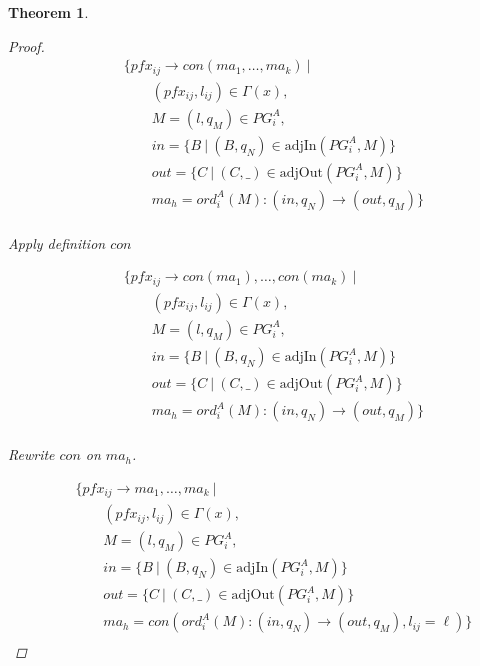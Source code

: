 \documentclass[twocolumn]{sig-alternate-10pt}
\newtheorem{thm}{Theorem}[section]
\begin{document}
\begin{thm}
\begin{proof}
  \[ \begin{array}{l}
     ~~~~~~~~~ \{ pfx_{ij} \rightarrow con(ma_1, \dots, ma_k) ~\vert~ \\
     ~~~~~~~~~~~~~~~~~~ (pfx_{ij}, l_{ij}) \in \Gamma(x), \\
     ~~~~~~~~~~~~~~~~~~ M = (l,q_M) \in PG^A_i, \\
     ~~~~~~~~~~~~~~~~~~ in = \{ B ~\vert~ (B,q_N) \in \text{adjIn}(PG^A_i,M) \} \\
     ~~~~~~~~~~~~~~~~~~ out = \{ C ~\vert~ (C,\_) \in \text{adjOut}(PG^A_i,M) \} \\
     ~~~~~~~~~~~~~~~~~~ ma_h = ord^A_i(M) : (in,q_N) \rightarrow (out,q_M) \} \\
  \end{array} \]%

  Apply definition $con$

  \[ \begin{array}{l}
     ~~~~~~~~~ \{ pfx_{ij} \rightarrow con(ma_1), \dots, con(ma_k) ~\vert~ \\
     ~~~~~~~~~~~~~~~~~~ (pfx_{ij}, l_{ij}) \in \Gamma(x), \\
     ~~~~~~~~~~~~~~~~~~ M = (l,q_M) \in PG^A_i, \\
     ~~~~~~~~~~~~~~~~~~ in = \{ B ~\vert~ (B,q_N) \in \text{adjIn}(PG^A_i,M) \} \\
     ~~~~~~~~~~~~~~~~~~ out = \{ C ~\vert~ (C,\_) \in \text{adjOut}(PG^A_i,M) \} \\
     ~~~~~~~~~~~~~~~~~~ ma_h = ord^A_i(M) : (in,q_N) \rightarrow (out,q_M) \} \\
  \end{array} \]%

  Rewrite $con$ on $ma_h$.

  \[ \begin{array}{l}
     ~~~~~~~~~ \{ pfx_{ij} \rightarrow ma_1, \dots, ma_k ~\vert~ \\
     ~~~~~~~~~~~~~~~~~~ (pfx_{ij}, l_{ij}) \in \Gamma(x), \\
     ~~~~~~~~~~~~~~~~~~ M = (l,q_M) \in PG^A_i, \\
     ~~~~~~~~~~~~~~~~~~ in = \{ B ~\vert~ (B,q_N) \in \text{adjIn}(PG^A_i,M) \} \\
     ~~~~~~~~~~~~~~~~~~ out = \{ C ~\vert~ (C,\_) \in \text{adjOut}(PG^A_i,M) \} \\
     ~~~~~~~~~~~~~~~~~~ ma_h = con(ord^A_i(M) : (in,q_N) \rightarrow (out,q_M), l_{ij} = \ell) \} \\
  \end{array} \]%


\end{proof}
\end{thm}
\end{document}

